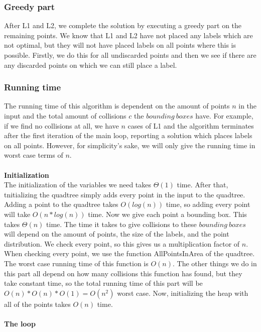 \documentclass[crop=false,a4paper,oneside,11pt]{article}
\begin{document}
\subsubsection{Greedy part}
After L1 and L2, we complete the solution by executing a greedy part on the remaining points. We know that L1 and L2 have not placed any labels which are not optimal, but they will not have placed labels on all points where this is possible. Firstly, we do this for all undiscarded points and then we see if there are any discarded points on which we can still place a label.

\subsubsection{Running time}
The running time of this algorithm is dependent on the amount of points $n$ in the input and the total amount of collisions $c$ the $bounding \ boxes$ have. For example, if we find no collisions at all, we have $n$ cases of L1 and the algorithm terminates after the first iteration of the main loop, reporting a solution which places labels on all points. However, for simplicity's sake, we will only give the running time in worst case terms of $n$. \\ \\
\textbf{Initialization}\\
The initialization of the variables we need takes $\Theta(1)$ time. After that, tnitializing the quadtree simply adds every point in the input to the quadtree. Adding a point to the quadtree takes $O(log(n))$ time, so adding every point will take $O(n*log(n))$ time. Now we give each point a bounding box. This takes $\Theta(n)$ time. The time it takes to give collisions to these $bounding \ boxes$ will depend on the amount of points, the size of the labels, and the point distribution. We check  every point, so this gives us a multiplication factor of $n$. When checking every point, we use the function AllPointsInArea of the quadtree. The worst case running time of this function is $O(n)$. The other things we do in this part all depend on how many collisions this function has found, but they take constant time, so the total running time of this part will be $O(n)*O(n)*O(1) = O(n^2)$ worst case. Now, initializing the heap with all of the points takes $O(n)$ time.  \\ \\
 \textbf{The loop} \\
\end{document}
